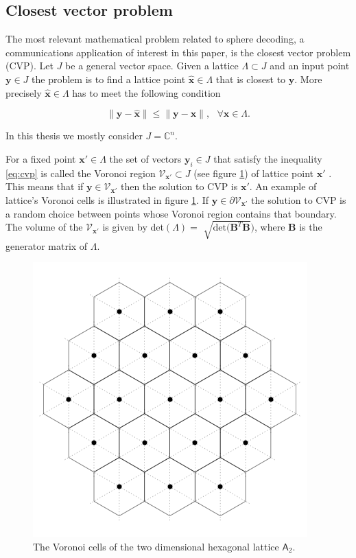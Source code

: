 \documentclass[english,12pt,a4paper,pdftex,sci,utf8]{aaltothesis}
\begin{document}
\subsection{Closest vector problem}

The most relevant mathematical problem related to sphere decoding, a communications application of interest in this paper, is the closest vector problem (CVP). Let $J$ be a general vector space. Given a lattice $\Lambda \subset J$ and an input point $\mathbf{y} \in J$ the problem is to find a lattice point $\hat{\mathbf{x}} \in \Lambda$ that is closest to $\mathbf{y}$. More precisely $\hat{\mathbf{x}} \in \Lambda$ has to meet the following condition

\begin{equation}
\|\mathbf{y}-\hat{\mathbf{x}}\| \leq \|\mathbf{y}-\mathbf{x}\|, \ \ \ \forall \mathbf{x} \in \Lambda.
\label{eq:cvp}
\end{equation}

\noindent In this thesis we mostly consider $J=\mathbb{C}^n$. 
\par For a fixed point $\mathbf{x}' \in \Lambda$ the set of vectors $\mathbf{y}_i \in J$ that satisfy the inequality \eqref{eq:cvp} is called the Voronoi region $\mathcal{V}_{\mathbf{x}'} \subset J$ (see figure \ref{fig:voronoi}) of lattice point $\mathbf{x}'$ \cite{zamir}. This means that if $\mathbf{y} \in \mathcal{V}_{\mathbf{x}'}$ then the solution to CVP is $\mathbf{x}'$. An example of lattice's Voronoi cells is illustrated in figure \ref{fig:voronoi}. If $\mathbf{y} \in \partial\mathcal{V}_{\mathbf{x}'}$ the solution to CVP is a random choice between points whose Voronoi region contains that boundary. The volume of the $\mathcal{V}_{\mathbf{x}'}$
is given by det$(\Lambda) = $ $\sqrt{\text{det}(\mathbf{B}^T\mathbf{B}})$, where $\mathbf{B}$ is the generator matrix of $\Lambda$. 

\begin{figure}[ht]
  \centering
  \includegraphics[width=0.5\linewidth]{voronoi_cells}
  \caption{The Voronoi cells of the two dimensional hexagonal lattice $\mathsf{A}_2$.}
  \label{fig:voronoi}
\end{figure}
\end{document}
